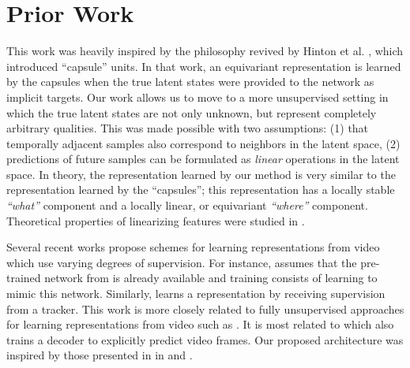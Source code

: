 \section{Prior Work}
\label{sec:prior work} 
This work was heavily inspired by the philosophy revived by Hinton et al. \cite{capsules}, which introduced ``capsule'' units. In that work, an equivariant
representation is learned by the capsules when the true latent states were provided to the network as implicit targets. Our work allows us to move to a more unsupervised setting in which the true latent states are not only unknown, but represent completely arbitrary qualities. This was made possible with two assumptions: (1) that temporally adjacent samples also correspond to neighbors in the latent space, (2) predictions of future samples can be formulated as \emph{linear} operations in the latent space. In theory, the representation learned by our method is very similar to the representation learned by the ``capsules''; this representation has a locally stable \emph{``what''} component and a locally linear, or equivariant
 \emph{``where''} component. Theoretical properties of linearizing features were studied in \cite{taco}.    

Several recent works propose schemes for learning representations from video which use varying degrees of supervision\cite{FBvideo}\cite{supFromTracker}\cite{predAlexNet}\cite{slowAE}. For instance, \cite{predAlexNet} assumes that the pre-trained network from \cite{ImageNet} is already available and training consists of learning to mimic this network. Similarly, \cite{supFromTracker} learns a representation by receiving supervision from a tracker. This work is more closely related to fully unsupervised approaches for learning representations from video such as \cite{slowAE}\cite{SSA}\cite{Cadieu}\cite{SFA}\cite{DrLIMVideo}. It is most related to \cite{FBvideo} which also trains a decoder to explicitly predict video frames. Our proposed architecture was inspired by those presented in in \cite{ranzato2007} and \cite{zeiler2010}. 

